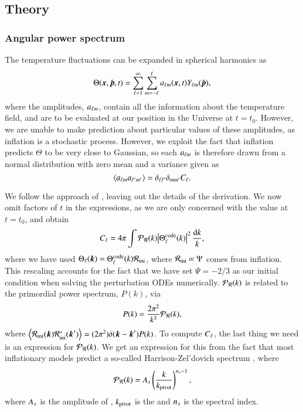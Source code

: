 \subsection{Theory}\label{ssec:M4:theory}

\subsubsection{Angular power spectrum} \label{sssec:M4:theory:angular_power_spectrum}
The temperature fluctuations can be expanded in spherical harmonics as  
\begin{equation} \label{eq:M4:theory:theta_expansion_in_spherical_harmonics}
    \Theta(\boldsymbol{x}, \hat{\boldsymbol{p}}, t) = \sum_{\ell=1}^{\infty} \sum_{m=-\ell}^{\ell} a_{\ell m}(\boldsymbol{x}, t) Y_{\ell m}(\hat{\boldsymbol{p}}), 
\end{equation}
where the amplitudes, $a_{\ell m}$, contain all the information about the temperature field, and are to be evaluated at our position in the Universe at $t=t_0$. However, we are unable to make prediction about particular values of these amplitudes, as inflation is a stochastic process. However, we exploit the fact that inflation predicts $\Theta$ to be very close to Gaussian, so each $a_{\ell m}$ is therefore drawn from a normal distribution with zero mean and a variance given as 
\begin{equation} \label{eq:M4:theory:variance_of_alms}
    \expval{a_{\ell m}a_{\ell' m'}} = \delta_{\ell \ell'} \delta_{m m'} C_\ell.
\end{equation} 

We follow the approach of \cite[Ch. 9.5]{Dodelson}, leaving out the details of the derivation. We now omit factors of $t$ in the expressions, as we are only concerned with the value at $t=t_0$, and obtain   
\begin{equation} \label{eq:M4:theory:C_ell_integral_definition}
    C_\ell = 4\pi \int \mathcal{P}_{\mathcal{R}} (k) \abs{\Theta_\ell^\mathrm{code}(k)}^2 \,\frac{\dd k}{k},
\end{equation}
where we have used $\Theta_\ell(\boldsymbol{k})= \Theta_\ell^\mathrm{code}(k) \mathcal{R}_\mathrm{ini}$, where $\mathcal{R}_\mathrm{ini}\propto\Psi$ comes from inflation. This rescaling accounts for the fact that we have set $\Psi=-2/3$ as our initial condition when solving the perturbation ODEs numerically. $\mathcal{P}_{\mathcal{R}}(k)$ is related to the primordial power spectrum, $P(k)$, via 
\begin{equation} \label{eq:M4:theory:primordial_power_spectrum_}
    P(k) = \frac{2\pi^2}{k^3}\mathcal{P}_{\mathcal{R}}(k),
\end{equation}
where $\expval{\mathcal{R}_\mathrm{ini}(\ensuremath{\boldsymbol{k}}) \mathcal{R}_\mathrm{ini}^*(\ensuremath{\boldsymbol{k}}')}=(2\pi^2)\delta(\boldsymbol{k}-\boldsymbol{k}') P(k)$. To compute $C_\ell$, the last thing we need is an expression for $\mathcal{P}_{\mathcal{R}}(k)$. We get an expression for this from the fact that most inflationary models predict a so-called Harrison-Zel'dovich spectrum , where 
\begin{equation} \label{eq:M4:theory:primordial_power_spectrum}
    \mathcal{P}_{\mathcal{R}}(k) = A_s \left( \frac{k}{k_\mathrm{pivot}} \right)^{n_s-1}, 
\end{equation}
where $A_s$ is the amplitude of , $k_\mathrm{pivot}$ is the  and $n_s$ is the spectral index.  


